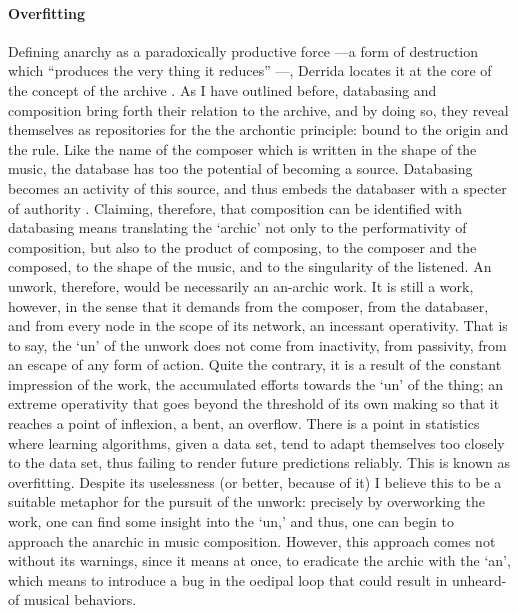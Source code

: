 \paragraph{Overfitting}
Defining anarchy as a paradoxically productive force ---a form of destruction which ``produces the very thing it reduces'' \parencite{Der95:Arc}---, Derrida locates it at the core of the concept of the archive . As I have outlined before, databasing and composition bring forth their relation to the archive, and by doing so, they reveal themselves as repositories for the the archontic principle: bound to the origin and the rule. Like the name of the composer which is written in the shape of the music, the database has too the potential of becoming a source. Databasing becomes an activity of this source, and thus embeds the databaser with a specter of authority . Claiming, therefore, that composition can be identified with databasing means translating the `archic' not only to the performativity of composition, but also to the product of composing, to the composer and the composed, to the shape of the music, and to the singularity of the listened. An unwork, therefore, would be necessarily an an-archic work. It is still a work, however, in the sense that it demands from the composer, from the databaser, and from every node in the scope of its network, an incessant operativity. That is to say, the `un' of the unwork does not come from inactivity, from passivity, from an escape of any form of action. Quite the contrary, it is a result of the constant impression of the work, the accumulated efforts towards the `un' of the thing; an extreme operativity that goes beyond the threshold of its own making so that it reaches a point of inflexion, a bent, an overflow. There is a point in statistics where learning algorithms, given a data set, tend to adapt themselves too closely to the data set, thus failing to render future predictions reliably. This is known as overfitting. Despite its uselessness (or better, because of it) I believe this to be a suitable metaphor for the pursuit of the unwork: precisely by overworking the work, one can find some insight into the `un,' and thus, one can begin to approach the anarchic in music composition. However, this approach comes not without its warnings, since it means at once, to eradicate the archic with the `an', which means to introduce a bug in the oedipal loop that could result in unheard-of musical behaviors.
